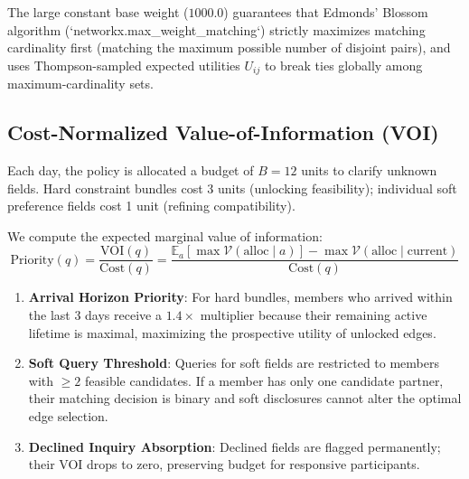 \documentclass[10pt,twocolumn,letterpaper]{article}
\begin{document}
The large constant base weight ($1000.0$) guarantees that Edmonds' Blossom algorithm (`networkx.max_weight_matching`) strictly maximizes matching cardinality first (matching the maximum possible number of disjoint pairs), and uses Thompson-sampled expected utilities $U_{ij}$ to break ties globally among maximum-cardinality sets.

\subsection{Cost-Normalized Value-of-Information (VOI)}
Each day, the policy is allocated a budget of $B = 12$ units to clarify unknown fields. Hard constraint bundles cost 3 units (unlocking feasibility); individual soft preference fields cost 1 unit (refining compatibility).

We compute the expected marginal value of information:
\begin{equation}
\text{Priority}(q) = \frac{\text{VOI}(q)}{\text{Cost}(q)} = \frac{\mathbb{E}_a\left[\max \mathcal{V}(\text{alloc} \mid a)\right] - \max \mathcal{V}(\text{alloc} \mid \text{current})}{\text{Cost}(q)}
\end{equation}
\begin{enumerate}[leftmargin=*]
    \item \textbf{Arrival Horizon Priority}: For hard bundles, members who arrived within the last 3 days receive a $1.4\times$ multiplier because their remaining active lifetime is maximal, maximizing the prospective utility of unlocked edges.
    \item \textbf{Soft Query Threshold}: Queries for soft fields are restricted to members with $\ge 2$ feasible candidates. If a member has only one candidate partner, their matching decision is binary and soft disclosures cannot alter the optimal edge selection.
    \item \textbf{Declined Inquiry Absorption}: Declined fields are flagged permanently; their VOI drops to zero, preserving budget for responsive participants.
\end{enumerate}
\end{document}
